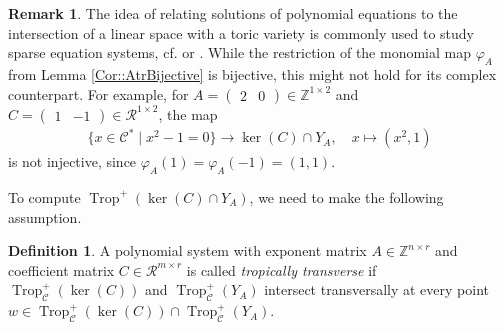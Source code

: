\documentclass{article}
\theoremstyle{definition}
\newtheorem{definition}[theorem]{Definition}
\newtheorem{remark}[theorem]{Remark}
\DeclareMathOperator{\Trop}{Trop}
\newcommand{\RR}{\mathcal{R}}
\begin{document}
\begin{remark}
The idea of relating solutions of polynomial equations to the intersection of a linear space with a toric variety is commonly used to study sparse equation systems, cf. \cite[Section 3.1.1]{sottile2011real} or \cite[Section 3.4]{telen2022introductiontoricgeometry}. While the restriction of the monomial map $\varphi_A$ from Lemma \ref{Cor::AtrBijective} is bijective, this might not hold for its complex counterpart. For example, for $A = \begin{pmatrix}
    2 & 0
\end{pmatrix} \in \mathbb{Z}^{1 \times 2}$ and $C = \begin{pmatrix}
    1 & -1
\end{pmatrix}  \in \mathcal{R}^{1 \times 2}$, the map 
\begin{align*}
\big\{ x \in \mathcal{C}^* \mid  x^2 -1  = 0 \big\} \to \ker(C) \cap Y_A, \quad  x \mapsto (x^2,1)
\end{align*}
is not injective, since $\varphi_A(1) = \varphi_A(-1) = (1,1)$.
\end{remark}


To compute $\Trop^+(\ker(C) \cap Y_A)$, we need to make the following assumption.


  \begin{definition}
 A polynomial system with exponent matrix $A \in \mathbb{Z}^{n \times r}$
and coefficient matrix $C \in \mathbb{\RR}^{m \times r}$ is called \emph{tropically transverse} if $\Trop_\mathcal{C}^+(\ker(C) )$ and  $\Trop_\mathcal{C}^+(Y_A)$ intersect transversally at every point $w \in \Trop_\mathcal{C}^+(\ker(C) ) \cap \Trop_\mathcal{C}^+(Y_A ) $.
\end{definition}
\end{document}
